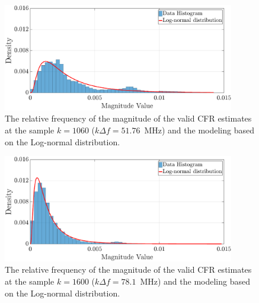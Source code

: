 \begin{figure}[h!]
	\centering
	\includegraphics[width=0.9\textwidth]{images/Mag_histlW_2.eps}
	\caption{The relative frequency of the magnitude of the valid CFR estimates at the sample $k = 1060$ ($k\Delta f= 51.76$~MHz) and the modeling based on the Log-normal distribution.}
	\label{mag_examplelW}
\end{figure}

\begin{figure}[h!]
	\centering
	\includegraphics[width=0.9\textwidth]{images/Mag_hist2lW_2.eps}
	\caption{ The relative frequency of the magnitude of the valid CFR estimates at the sample $k = 1600$ ($k\Delta f= 78.1$~MHz) and the modeling based on the Log-normal distribution.}
	\label{mag_example2lW}
\end{figure}

